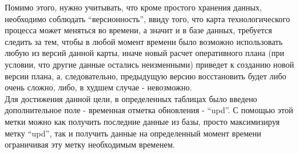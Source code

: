 \indent Помимо этого, нужно учитывать, что кроме простого хранения данных, необходимо соблюдать ``версионность'', ввиду того, что карта технологического процесса может меняться во времени, а значит и в базе данных, требуется следить за тем, чтобы в любой момент времени было возможно использовать любую из версий данной карты, иначе новый расчет оперативного плана (при условии, что другие данные остались неизменными) приведет к созданию новой версии плана, а, следовательно, предыдущую версию восстановить будет либо очень сложно, либо, в худшем случае - невозможно.\\
\indent Для достижения данной цели, в определенных таблицах было введено дополнительное поле - временная отметка обновления - ``upd''.
С помощью этой метки можно как получить последние данные из базы, просто максимизируя метку ``upd'', так и получить данные на определенный момент времени ограничивая эту метку необходимым временем.